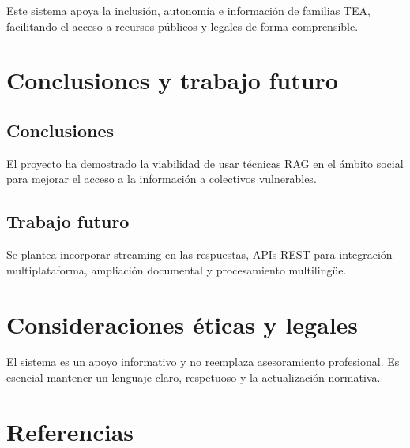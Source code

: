 \documentclass[a4paper,12pt]{article}
\begin{document}
Este sistema apoya la inclusión, autonomía e información de familias TEA, facilitando el acceso a recursos públicos y legales de forma comprensible.

\section{Conclusiones y trabajo futuro}

\subsection{Conclusiones}

El proyecto ha demostrado la viabilidad de usar técnicas RAG en el ámbito social para mejorar el acceso a la información a colectivos vulnerables.

\subsection{Trabajo futuro}

Se plantea incorporar streaming en las respuestas, APIs REST para integración multiplataforma, ampliación documental y procesamiento multilingüe.

\section{Consideraciones éticas y legales}

El sistema es un apoyo informativo y no reemplaza asesoramiento profesional. Es esencial mantener un lenguaje claro, respetuoso y la actualización normativa.

\section{Referencias}
\end{document}
